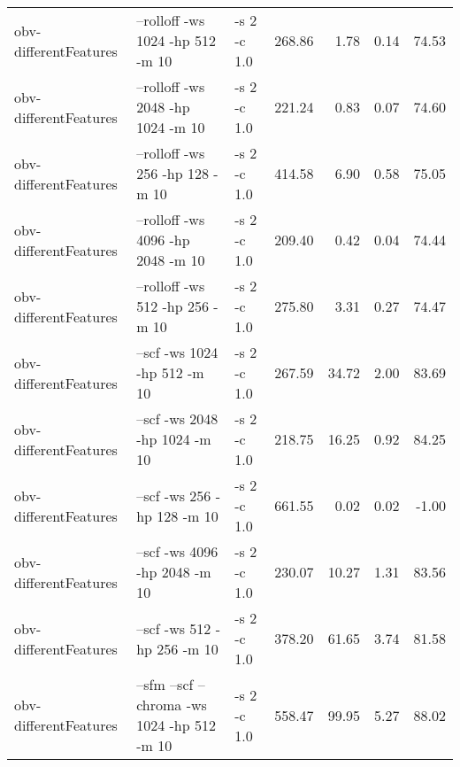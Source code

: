 \documentclass[11pt,a4paper]{article}
\begin{document}
\begin{tabular}{lllrrrr}
 obv-differentFeatures  &  --rolloff -ws 1024 -hp 512 -m 10                                                                                   &  -s 2 -c 1.0  &   268.86  &    1.78  &   0.14  &  74.53  \\
 obv-differentFeatures  &  --rolloff -ws 2048 -hp 1024 -m 10                                                                                  &  -s 2 -c 1.0  &   221.24  &    0.83  &   0.07  &  74.60  \\
 obv-differentFeatures  &  --rolloff -ws 256 -hp 128 -m 10                                                                                    &  -s 2 -c 1.0  &   414.58  &    6.90  &   0.58  &  75.05  \\
 obv-differentFeatures  &  --rolloff -ws 4096 -hp 2048 -m 10                                                                                  &  -s 2 -c 1.0  &   209.40  &    0.42  &   0.04  &  74.44  \\
 obv-differentFeatures  &  --rolloff -ws 512 -hp 256 -m 10                                                                                    &  -s 2 -c 1.0  &   275.80  &    3.31  &   0.27  &  74.47  \\
 obv-differentFeatures  &  --scf -ws 1024 -hp 512 -m 10                                                                                       &  -s 2 -c 1.0  &   267.59  &   34.72  &   2.00  &  83.69  \\
 obv-differentFeatures  &  --scf -ws 2048 -hp 1024 -m 10                                                                                      &  -s 2 -c 1.0  &   218.75  &   16.25  &   0.92  &  84.25  \\
 obv-differentFeatures  &  --scf -ws 256 -hp 128 -m 10                                                                                        &  -s 2 -c 1.0  &   661.55  &    0.02  &   0.02  &  -1.00  \\
 obv-differentFeatures  &  --scf -ws 4096 -hp 2048 -m 10                                                                                      &  -s 2 -c 1.0  &   230.07  &   10.27  &   1.31  &  83.56  \\
 obv-differentFeatures  &  --scf -ws 512 -hp 256 -m 10                                                                                        &  -s 2 -c 1.0  &   378.20  &   61.65  &   3.74  &  81.58  \\
 obv-differentFeatures  &  --sfm --scf --chroma -ws 1024 -hp 512 -m 10                                                                        &  -s 2 -c 1.0  &   558.47  &   99.95  &   5.27  &  88.02  \\

\end{tabular}
\end{document}
